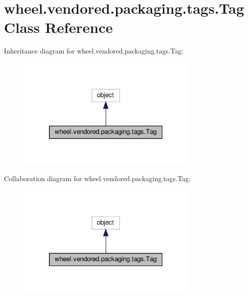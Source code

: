 \hypertarget{classwheel_1_1vendored_1_1packaging_1_1tags_1_1Tag}{}\section{wheel.\+vendored.\+packaging.\+tags.\+Tag Class Reference}
\label{classwheel_1_1vendored_1_1packaging_1_1tags_1_1Tag}


Inheritance diagram for wheel.\+vendored.\+packaging.\+tags.\+Tag\+:
\nopagebreak
\begin{figure}[H]
\begin{center}
\leavevmode
\includegraphics[width=253pt]{classwheel_1_1vendored_1_1packaging_1_1tags_1_1Tag__inherit__graph}
\end{center}
\end{figure}


Collaboration diagram for wheel.\+vendored.\+packaging.\+tags.\+Tag\+:
\nopagebreak
\begin{figure}[H]
\begin{center}
\leavevmode
\includegraphics[width=253pt]{classwheel_1_1vendored_1_1packaging_1_1tags_1_1Tag__coll__graph}
\end{center}
\end{figure}
